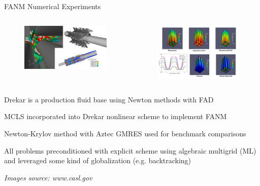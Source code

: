 \documentclass{beamer}
\begin{document}
\begin{frame}{FANM Numerical Experiments}

  \begin{columns}
    \begin{column}{0.5\textwidth}
      \begin{figure}[htpb!]
        \begin{center}
          \includegraphics[width=2.0in]{drekar1.png}
        \end{center}
      \end{figure}
    \end{column}

    \begin{column}{0.5\textwidth}
      \begin{figure}[htpb!]
        \begin{center}
          \includegraphics[width=2.0in]{drekar2.png}
        \end{center}
      \end{figure}
    \end{column}
  \end{columns}

  \medskip

  \begin{itemize}
    {\small
    \item Drekar is a production fluid base using Newton methods
      with FAD
      \medskip
    \item MCLS incorporated into Drekar nonlinear scheme to implement
      FANM
      \medskip
    \item Newton-Krylov method with Aztec GMRES used for benchmark
      comparisons
    \item All problems preconditioned with explicit scheme using
      algebraic multigrid (ML) and leveraged some kind of
      globalization (e.g. backtracking) 
    }
  \end{itemize}

  {\small \sl Images source: www.casl.gov}

\end{frame}
\end{document}
